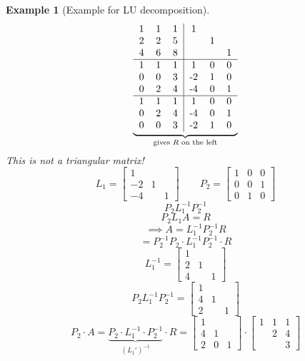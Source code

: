 \documentclass[a4paper,landscape,twocolumn]{article}
\newtheorem{ex}{Example}[section]
\begin{document}
\begin{ex}[Example for LU decomposition]
  \[
    \underbrace{\begin{tabular}{ccc|ccc}
      1 & 1 & 1 & 1 &   & \\
      2 & 2 & 5 &   & 1 & \\
      4 & 6 & 8 &   &   & 1 \\
    \hline
      1 & 1 & 1 & 1 & 0 & 0 \\
      0 & 0 & 3 & -2 & 1 & 0 \\
      0 & 2 & 4 & -4 & 0 & 1 \\
    \hline
      1 & 1 & 1 & 1 & 0 & 0 \\
      0 & 2 & 4 & -4 & 0 & 1 \\
      0 & 0 & 3 & -2 & 1 & 0
    \end{tabular}}_{\text{gives } R \text{ on the left}}
  \]
  This is not a triangular matrix!
  \[
    L_1 = \begin{bmatrix}
       1 &   & \\
      -2 & 1 &  \\
      -4 &   & 1
    \end{bmatrix}
    \qquad
    P_2 = \begin{bmatrix}
      1 & 0 & 0 \\
      0 & 0 & 1 \\
      0 & 1 & 0
    \end{bmatrix}
  \] \[
    P_2 L_1^{-1} P_2^{-1}
  \] \[
    P_2 L_1 A = R
  \] \[
    \implies A = L_1^{-1} P_2^{-1} R
  \] \[
    = P_2^{-1} P_2 \cdot L_1^{-1} P_2^{-1} \cdot R
  \]
  \[
    L_1^{-1} = \begin{bmatrix}
      1 &   & \\
      2 & 1 & \\
      4 &   & 1
    \end{bmatrix}
  \] \[
    P_2 L_1^{-1} P_2^{-1} = \begin{bmatrix}
      1 &   & \\
      4 & 1 & \\
      2 &   & 1
    \end{bmatrix}
  \] \[
    P_2 \cdot A = \underbrace{P_2 \cdot L_1^{-1} \cdot P_2^{-1}}_{(L_1')^{-1}} \cdot R
      = \begin{bmatrix}
        1 &   & \\
        4 & 1 & \\
        2 & 0 & 1
      \end{bmatrix} \cdot \begin{bmatrix}
        1 & 1 & 1 \\
          & 2 & 4 \\
          &   & 3
      \end{bmatrix}
  \]
\end{ex}
\end{document}
